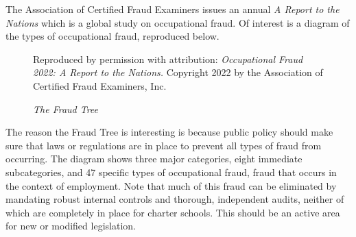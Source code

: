 The Association of Certified Fraud Examiners issues an annual \textit{A Report to the Nations} which is a global study on occupational fraud. Of interest is a diagram of the types of occupational fraud, reproduced below.
\begin{figure}[htbp]
  \caption{\textit{The Fraud Tree}}%
  \label{fig:fraud-tree}\centering%
    {Reproduced by permission with attribution: \textit{Occupational Fraud 2022: A Report to the Nations.} Copyright 2022 by the Association of Certified Fraud Examiners, Inc.}
  \end{figure}
  The reason the Fraud Tree is interesting is because public policy should make sure that laws or regulations are in place to prevent all types of fraud from occurring. The diagram shows three major categories, eight immediate subcategories, and 47 specific types of occupational fraud, fraud that occurs in the context of employment. Note that much of this fraud can be eliminated by mandating robust internal controls and thorough, independent audits, neither of which are completely in place for charter schools. This should be an active area for new or modified legislation.


